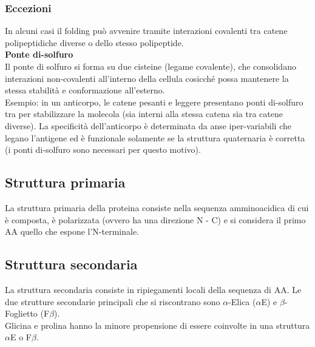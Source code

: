         \subsubsection{Eccezioni}
            In alcuni casi il folding può avvenire tramite interazioni covalenti tra catene polipeptidiche diverse o dello stesso polipeptide.\\
            
            \textbf{Ponte di-solfuro}  \\
                Il ponte di solfuro si forma su due cisteine (legame covalente), che consolidano interazioni non-covalenti all'interno della cellula cosicché possa mantenere la stessa stabilità e conformazione all'esterno.\\
                Esempio: in un anticorpo, le catene pesanti e leggere presentano ponti di-solfuro tra per stabilizzare la molecola (sia interni alla stessa catena sia tra catene diverse). 
                La specificità dell'anticorpo è determinata da anse iper-variabili che legano l'antigene ed è funzionale solamente se la struttura quaternaria è corretta (i ponti di-solfuro sono necessari per questo motivo).
    
    \subsection{Struttura primaria}
        La struttura primaria della proteina consiste nella sequenza amminoacidica di cui è composta, è polarizzata (ovvero ha una direzione N - C) e si considera il primo AA quello che espone l'N-terminale.
    
    \subsection{Struttura secondaria}
        La struttura secondaria consiste in ripiegamenti locali della sequenza di AA. Le due strutture secondarie principali che si riscontrano sono $\alpha$-Elica ($\alpha$E) e $\beta$-Foglietto (F$\beta$). \\
        Glicina e prolina hanno la minore propensione di essere coinvolte in una struttura $\alpha$E o F$\beta$.
